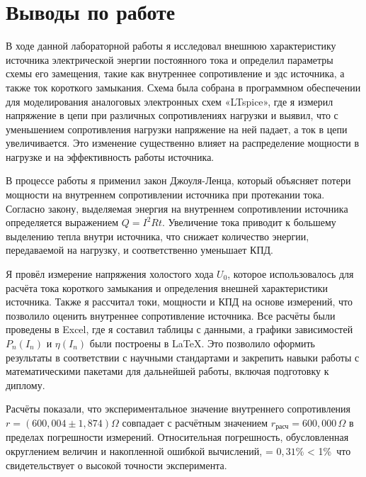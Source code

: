 \documentclass[a4paper]{article}
\begin{document}
% 
% 


\section{Выводы по работе}

В ходе данной лабораторной работы я исследовал внешнюю характеристику источника электрической
энергии постоянного тока и определил параметры схемы его замещения, такие как внутреннее сопротивление и эдс источника, а также ток короткого замыкания. Схема была собрана в программном обеспечении для моделирования аналоговых электронных
схем «LTspice», где я измерил напряжение в цепи при различных сопротивлениях нагрузки
и выявил, что с уменьшением сопротивления нагрузки напряжение на ней падает,
а ток в цепи увеличивается. Это изменение существенно влияет на распределение мощности в
нагрузке и на эффективность работы источника.

В процессе работы я применил закон Джоуля-Ленца,
который объясняет потери мощности на внутреннем сопротивлении источника при протекании тока.
Согласно закону, выделяемая энергия на внутреннем сопротивлении источника определяется
выражением \(Q = I^2 R t\). Увеличение тока приводит к большему выделению тепла внутри источника,
что снижает количество энергии, передаваемой на нагрузку, и соответственно уменьшает КПД.

Я провёл измерение напряжения холостого хода \( U_0 \),
которое использовалось для расчёта тока короткого замыкания
и определения внешней характеристики источника.
Также я рассчитал токи, мощности и КПД на основе измерений,
что позволило оценить внутреннее сопротивление источника.
Все расчёты были проведены в Excel, где я составил таблицы с данными, а графики зависимостей
\( P_n(I_n) \) и \( \eta(I_n) \) были построены в LaTeX.
Это позволило оформить результаты в соответствии с научными стандартами и
закрепить навыки работы с математическими пакетами для дальнейшей работы,
включая подготовку к диплому.

Расчёты показали, что экспериментальное значение внутреннего сопротивления \(r = (600{,}004 \pm 1{,}874) \Omega \) совпадает с расчётным значением \( r_{\text{расч}} = 600{,}000\,\Omega \) в пределах погрешности измерений. Относительная погрешность, обусловленная округлением величин и накопленной ошибкой вычислений, \varepsilon = \(0{,}31\%\) < 1\%\, что свидетельствует о высокой точности эксперимента.
\end{document}
